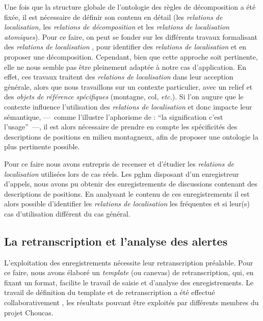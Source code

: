 Une fois que la structure globale de l'ontologie des règles de
décomposition a été fixée, il est nécessaire de définir son contenu en
détail (\ie les \emph{relations de localisation,} les \emph{relations
  de décomposition} et les \emph{relations de localisation
  atomiques}). Pour ce faire, on peut se fonder sur les différents
travaux formalisant des \emph{relations de localisation}
\autocite{Vandeloise1986,Aurnague1997,Borillo1998}, pour identifier
des \emph{relations de localisation} et en proposer une
décomposition. Cependant, bien que cette approche soit pertinente,
elle ne nous semble pas être pleinement adaptée à notre cas
d’application. En effet, ces travaux traitent des \emph{relations de
  localisation} dans leur acception générale, alors que nous
travaillons sur un contexte particulier, avec un relief et des
\emph{objets de référence spécifiques} (\eg montagne, col,
\emph{etc.}). Si l'on augure que le contexte influence l’utilisation
des \emph{relations de localisation} et donc impacte leur sémantique,
---~comme l'illustre l'aphorisme de  : \enquote{la
  signification c'est l'usage}~---, il est alors nécessaire de prendre
en compte les spécificités des descriptions de positions en milieu
montagneux, afin de proposer une ontologie la plus pertinente
possible.

Pour ce faire nous avons entrepris de recenser et d'étudier les
\emph{relations de localisation} utilisées lors de cas réels. Les
\ac{pghm} disposant d'un enregistreur d'appels, nous avons pu obtenir
des enregistrements de discussions contenant des descriptions de
positions. En analysant le contenu de ces enregistrements il est alors
possible d'identifier les \emph{relations de localisation} les
fréquentes et si leur(s) cas d'utilisation différent du cas général.

\subsection{La retranscription et l'analyse des alertes}

L'exploitation des enregistrements nécessite leur retranscription
préalable. Pour ce faire, nous avons élaboré un \emph{template} (ou
canevas) de retranscription, qui, en fixant un format, facilite le
travail de saisie et d'analyse des enregistrements. Le travail de
définition du template et de retranscription a été effectué
collaborativement \autocite{Bunel2019}, les résultats pouvant être
exploités par différents membres du projet Choucas.

